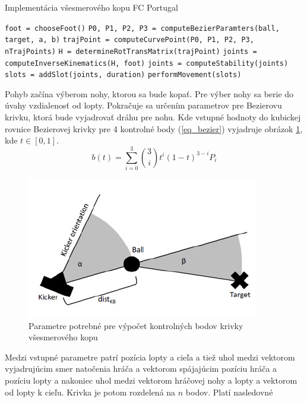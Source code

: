 \begin{algorithm}
	\caption{Implementácia všesmerového kopu FC Portugal}\label{} 
	\begin{algorithmic}
		\STATE \texttt{foot = chooseFoot()}
		\STATE \texttt{P0, P1, P2, P3 = computeBezierParamters(ball, target, a, b)}
			\STATE \texttt{trajPoint = computeCurvePoint(P0, P1, P2, P3, nTrajPoints)}
			\STATE \texttt{H = determineRotTransMatrix(trajPoint)}
			\STATE \texttt{joints = computeInverseKinematics(H, foot)}
			\STATE \texttt{joints = computeStability(joints)}
			\STATE \texttt{slots = addSlot(joints, duration)}
		\ENDFOR
		\STATE \texttt{performMovement(slots)}
	\end{algorithmic}
\end{algorithm}

Pohyb začína výberom nohy, ktorou sa bude kopať. Pre výber nohy sa berie do úvahy vzdialenosť od lopty. Pokračuje sa určením parametrov pre Bezierovu krivku, ktorá bude vyjadrovať dráhu pre nohu. Kde vstupné hodnoty do kubickej rovnice Bezierovej krivky pre 4 kontrolné body (\ref{eq_bezier}) vyjadruje obrázok \ref{pic_kick_arch_fc_portugal_params}, kde $t \in [0,1]$.
\begin{equation}\label{eq_bezier}
	b(t) = \sum_{i = 0}^{3}
	{
		{3 \choose i} t^i {(1 - t)}^{3 - i} P_i
	}
\end{equation}

\begin{figure}[H]
	\center
	\includegraphics[scale=1]{./data/kick_arch_fc_portugal_params}
	\caption{Parametre potrebné pre výpočet kontrolných bodov krivky všesmerového kopu \cite{fc_portugal}}
	\label{pic_kick_arch_fc_portugal_params}
\end{figure}

Medzi vstupné parametre patrí pozícia lopty a cieľa a tiež uhol medzi vektorom vyjadrujúcim smer natočenia hráča a vektorom spájajúcim pozíciu hráča a pozíciu lopty a nakoniec uhol medzi vektorom hráčovej nohy a lopty a vektorom od lopty k cieľu. Krivka je potom rozdelená na $n$ bodov. Platí nasledovné

